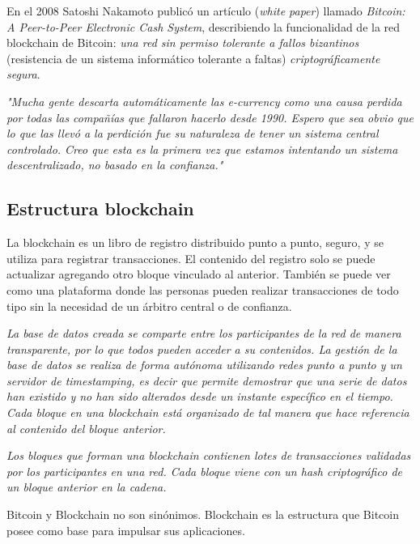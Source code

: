 En el 2008 Satoshi Nakamoto publicó un artículo (\textit{white paper}) llamado \textit{Bitcoin: A Peer-to-Peer Electronic Cash System}, describiendo la funcionalidad de la red blockchain de Bitcoin: \textit{una red sin permiso tolerante a fallos bizantinos} (resistencia de un sistema informático tolerante a faltas) \textit{criptográficamente segura}.

\begin{displayquote}
    \textit{"Mucha gente descarta automáticamente las e-currency como una causa perdida por todas las compañías que fallaron hacerlo desde 1990. Espero que sea obvio que lo que las llevó a la perdición fue su naturaleza de tener un sistema central controlado. Creo que esta es la primera vez que estamos intentando un sistema descentralizado, no basado en la confianza."}
\end{displayquote}

\subsection{Estructura blockchain}
La blockchain es un libro de registro distribuido punto a punto, seguro, y se utiliza para registrar transacciones. El contenido del registro solo se puede actualizar agregando otro bloque vinculado al anterior. También se puede ver como una plataforma donde las personas pueden realizar transacciones de todo tipo sin la necesidad de un árbitro central o de confianza.

\textit{La base de datos creada se comparte entre los participantes de la red de manera transparente, por lo que todos pueden acceder a su contenidos. La gestión de la base de datos se realiza de forma autónoma utilizando redes punto a punto y un servidor de timestamping, es decir que permite demostrar que una serie de datos han existido y no han sido alterados desde un instante específico en el tiempo. Cada bloque en una blockchain está organizado de tal manera que hace referencia al contenido del bloque anterior.}\cite{101blockchains}

\textit{Los bloques que forman una blockchain contienen lotes de transacciones validadas por los participantes en una red. Cada bloque viene con un hash criptográfico de un bloque anterior en la cadena.}\cite{101blockchains}

\begin{notesBox}
    Bitcoin y Blockchain no son sinónimos. Blockchain es la estructura que Bitcoin posee como base para impulsar sus aplicaciones.
\end{notesBox}


